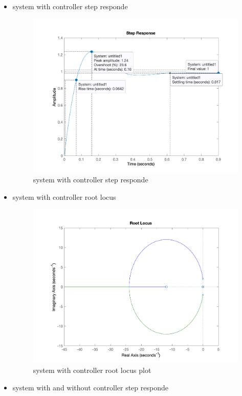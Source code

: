 \begin{itemize}
\begin{figure}[H]
    \end{figure}
    \item system with controller step responde
    \begin{figure}[H]
        \caption{system with controller step responde}
        \centering
        \includegraphics[width=12cm]{../Figure/Q1/Q1_system_controller_respond.png}
    \end{figure}
    \item system with controller root locus
    \begin{figure}[H]
        \caption{system with controller root locus plot}
        \centering
        \includegraphics[width=12cm]{../Figure/Q1/Q1_system_controller_rlocus.png}
    \end{figure}
    \item system with and without controller step responde
    \begin{figure}[H]

\end{figure}
\end{itemize}
